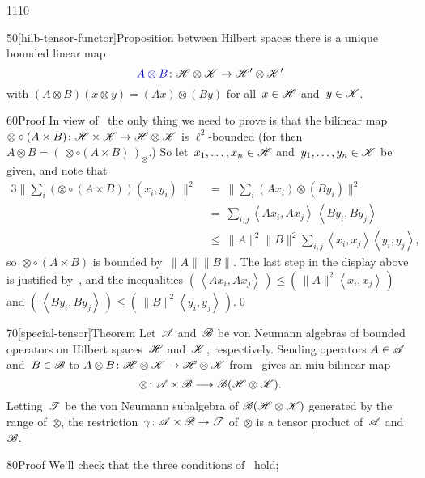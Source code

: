 \begin{parsec}{1110}
\begin{point}{50}[hilb-tensor-functor]{Proposition}
between Hilbert spaces
there is a unique bounded linear
map 
\begin{equation*}
	\Define{A\otimes B}\colon \scrH\otimes\scrK\to\scrH'\otimes\scrK'
\end{equation*}%
with $(A\otimes B)(x\otimes y)=(Ax)\otimes (By)$
for all~$x\in\mathscr{H}$
and~$y\in\mathscr{K}$.
\begin{point}{60}{Proof}%
In view of~
the only thing we need
to prove is that the bilinear map
$\otimes\circ (A\times B)\colon \mathscr{H}\times \mathscr{K}
\to\mathscr{H}\otimes\mathscr{K}$
is $\ell^2$-bounded
(for then~$A\otimes B=(\,\otimes\circ (A\times B)\,)_\otimes$.)
So let~$x_1,\dotsc,x_n\in\mathscr{H}$
and~$y_1,\dotsc,y_n\in\mathscr{K}$
be given,
and note that
\begin{alignat*}{3}
	\|\sum_{i}(\otimes\circ(A\times B))(x_i,y_i)\,\|^2
	\ &=\ 
	\|\sum_{i} (Ax_i)\otimes (By_i)\|^2
	\\
	\ &=\ 
	\sum_{i,j} 
	\left<Ax_i,Ax_j\right>
	\,\left<By_i,By_j\right>
	\\
	\ &\leq\ 
	\|A\|^2\|B\|^2
	\sum_{i,j} 
	\left<x_i,x_j\right>
	\left<y_i,y_j\right>,
\end{alignat*}
so~$\otimes\circ(A\times B)$
is bounded by~$\|A\|\|B\|$.
The last step in the display above
is justified by~,
and the inequalities
$(\,\left<Ax_i,A x_j\right>\,)\leq
(\, \|A\|^2 \left<x_i,x_j\right>\,)$
and
$(\,\left<By_i,B y_j\right>\,)\leq
(\, \|B\|^2 \left<y_i,y_j\right>\,)$.\qed
\end{point}
\end{point}
\begin{point}{70}[special-tensor]{Theorem}%
Let~$\mathscr{A}$
and~$\mathscr{B}$
be von Neumann algebras
of bounded operators
on Hilbert spaces~$\mathscr{H}$ and~$\mathscr{K}$,
respectively.
Sending operators $A\in\mathscr{A}$ and~$B\in\mathscr{B}$
to $A\otimes B\colon \mathscr{H}\otimes \mathscr{K}\to\mathscr{H}\otimes \mathscr{K}$
from~ gives
an miu-bilinear 
map 
\begin{equation*}
	\otimes\colon \mathscr{A}\times \mathscr{B}\longrightarrow
	\mathscr{B}(\mathscr{H}\otimes\mathscr{K}).
\end{equation*}
Letting~$\mathscr{T}$ 
be the von Neumann subalgebra
of $\mathscr{B}(\mathscr{H}\otimes\mathscr{K})$
generated by the range of~$\otimes$,
the restriction~$\gamma\colon \mathscr{A}\times \mathscr{B}\to\mathscr{T}$
of~$\otimes$
is a tensor product of~$\mathscr{A}$ and~$\mathscr{B}$.
\begin{point}{80}{Proof}%
We'll check that the three conditions of~ hold;

\end{point}
\end{point}
\end{parsec}
